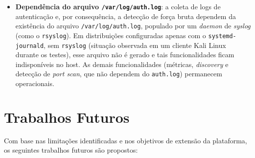 \documentclass[
    12pt
    ,oneside
    ,a4paper
    ,chapter=TITLE
    ,section=TITLE
    ,sumario=abnt-6027-2012]{abntex2}
\begin{document}
\begin{itemize}
          de um \textit{build} estático otimizado servido por um servidor web. A escolha
          simplifica a implantação, mas não é adequada a um ambiente de produção.
    \item \textbf{Dependência do arquivo \texttt{/var/log/auth.log}}: a coleta de logs
          de autenticação e, por consequência, a detecção de força bruta dependem da
          existência do arquivo \texttt{/var/log/auth.log}, populado por um \textit{daemon}
          de \textit{syslog} (como o \texttt{rsyslog}). Em distribuições configuradas apenas
          com o \texttt{systemd-journald}, sem \texttt{rsyslog} (situação observada em um
          cliente Kali Linux durante os testes), esse arquivo não é gerado e tais
          funcionalidades ficam indisponíveis no host. As demais funcionalidades (métricas,
          \textit{discovery} e detecção de \textit{port scan}, que não dependem do
          \texttt{auth.log}) permanecem operacionais.
\end{itemize}

\section{Trabalhos Futuros}
\label{sec:futuros}

Com base nas limitações identificadas e nos objetivos de extensão da plataforma, os
seguintes trabalhos futuros são propostos:
\end{document}
